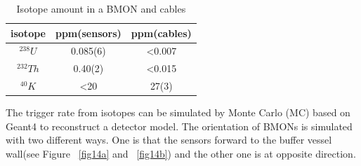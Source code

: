 \documentclass{JINST}
\begin{document}
\begin{table}
\caption{Isotope amount in a BMON and cables} %
\centering  %
\begin{tabular}{c c c } %
\hline\hline                        %
isotope& ppm(sensors)&ppm(cables)\\ [0.5ex] %
\hline                  %
$^{238}U$ & 0.085(6)& <0.007   \\ %
$^{232}Th$  & 0.40(2)  & <0.015 \\
$^{40}K$  & <20 & 27(3) \\ [1ex]      %
\hline %
\end{tabular}
\label{tab1} %
\end{table}

The trigger rate from isotopes can be simulated by Monte Carlo (MC) based on Geant4 to reconstruct a detector model. The orientation of BMONs is simulated with two different ways. One is that the sensors forward to the buffer vessel wall(see Figure ~\ref{fig14a} and ~\ref{fig14b}) and the other one is at opposite direction.

\end{document}
